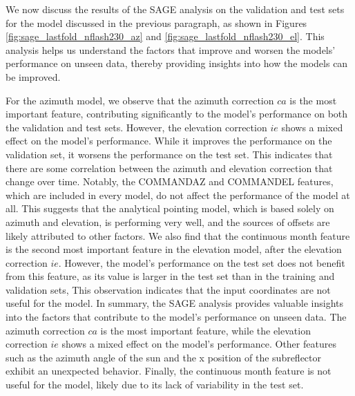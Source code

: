 We now discuss the results of the SAGE analysis on the validation and test sets for the model discussed in the previous paragraph,
as shown in Figures \ref{fig:sage_lastfold_nflash230_az} and \ref{fig:sage_lastfold_nflash230_el}.
This analysis helps us understand the factors that improve and worsen the models' performance on unseen data, thereby providing insights into how the models can be improved.

For the azimuth model, we observe that the azimuth correction $ca$ is the most important feature, contributing significantly to the model's performance on both the validation and test sets.
However, the elevation correction $ie$ shows a mixed effect on the model's performance.
While it improves the performance on the validation set, it worsens the performance on the test set.
This indicates that there are some correlation between the azimuth and elevation correction that change over time.
Notably, the COMMANDAZ and COMMANDEL features, which are included in every model, do not affect the performance of the model at all.
This suggests that the analytical pointing model, which is based solely on azimuth and elevation, is performing very well, and the sources of offsets are likely attributed to other factors.
We also find that the continuous month feature is the second most important feature in the elevation model, after the elevation correction $ie$.
However, the model's performance on the test set does not benefit from this feature, as its value is larger in the test set than in the training and validation sets,
This observation indicates that the input coordinates are not useful for the model.
In summary, the SAGE analysis provides valuable insights into the factors that contribute to the model's performance on unseen data.
The azimuth correction $ca$ is the most important feature, while the elevation correction $ie$ shows a mixed effect on the model's performance.
Other features such as the azimuth angle of the sun and the x position of the subreflector exhibit an unexpected behavior.
Finally, the continuous month feature is not useful for the model, likely due to its lack of variability in the test set.


